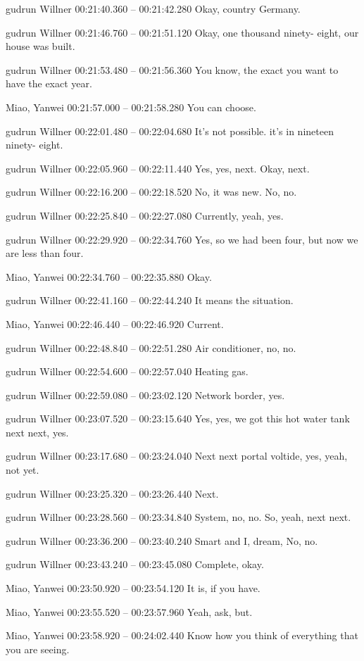 {gudrun Willner 00:21:40.360 -- 00:21:42.280
Okay, country Germany.

gudrun Willner 00:21:46.760 -- 00:21:51.120
Okay, one thousand ninety- eight, our house was built.

gudrun Willner 00:21:53.480 -- 00:21:56.360
You know, the exact you want to have the exact year.

Miao, Yanwei 00:21:57.000 -- 00:21:58.280
You can choose.

gudrun Willner 00:22:01.480 -- 00:22:04.680
It's not possible. it's in nineteen ninety- eight.

gudrun Willner 00:22:05.960 -- 00:22:11.440
Yes, yes, next. Okay, next.

gudrun Willner 00:22:16.200 -- 00:22:18.520
No, it was new. No, no.

gudrun Willner 00:22:25.840 -- 00:22:27.080
Currently, yeah, yes.

gudrun Willner 00:22:29.920 -- 00:22:34.760
Yes, so we had been four, but now we are less than four.

Miao, Yanwei 00:22:34.760 -- 00:22:35.880
Okay.

gudrun Willner 00:22:41.160 -- 00:22:44.240
It means the situation.

Miao, Yanwei 00:22:46.440 -- 00:22:46.920
Current.

gudrun Willner 00:22:48.840 -- 00:22:51.280
Air conditioner, no, no.

gudrun Willner 00:22:54.600 -- 00:22:57.040
Heating gas.

gudrun Willner 00:22:59.080 -- 00:23:02.120
Network border, yes.

gudrun Willner 00:23:07.520 -- 00:23:15.640
Yes, yes, we got this hot water tank next next, yes.

gudrun Willner 00:23:17.680 -- 00:23:24.040
Next next portal voltide, yes, yeah, not yet.

gudrun Willner 00:23:25.320 -- 00:23:26.440
Next.

gudrun Willner 00:23:28.560 -- 00:23:34.840
System, no, no. So, yeah, next next.

gudrun Willner 00:23:36.200 -- 00:23:40.240
Smart and I, dream, No, no.

gudrun Willner 00:23:43.240 -- 00:23:45.080
Complete, okay.

Miao, Yanwei 00:23:50.920 -- 00:23:54.120
It is, if you have.

Miao, Yanwei 00:23:55.520 -- 00:23:57.960
Yeah, ask, but.

Miao, Yanwei 00:23:58.920 -- 00:24:02.440
Know how you think of everything that you are seeing.

}
